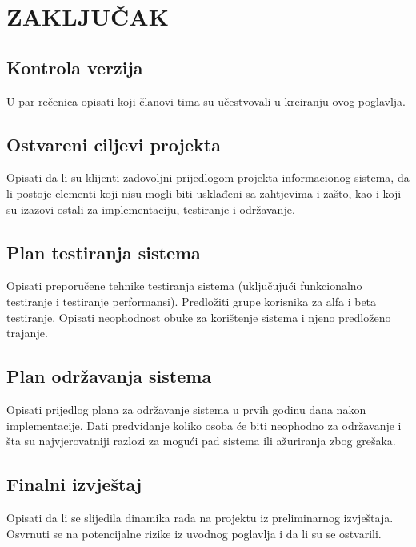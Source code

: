 \sloppy
\chapter{ZAKLJUČAK}

\sloppy
\section*{Kontrola verzija}

U par rečenica opisati koji članovi tima su učestvovali u kreiranju ovog poglavlja.

\sloppy
\section{Ostvareni ciljevi projekta}

Opisati da li su klijenti zadovoljni prijedlogom projekta informacionog sistema, da li postoje elementi koji nisu mogli biti usklađeni sa zahtjevima i zašto, kao i koji su izazovi ostali za implementaciju, testiranje i održavanje.

\sloppy
\section{Plan testiranja sistema}

Opisati preporučene tehnike testiranja sistema (uključujući funkcionalno testiranje i testiranje performansi). Predložiti grupe korisnika za alfa i beta testiranje. Opisati neophodnost obuke za korištenje sistema i njeno predloženo trajanje.

\sloppy
\section{Plan održavanja sistema}

Opisati prijedlog plana za održavanje sistema u prvih godinu dana nakon implementacije. Dati predviđanje koliko osoba će biti neophodno za održavanje i šta su najvjerovatniji razlozi za mogući pad sistema ili ažuriranja zbog grešaka.

\sloppy
\section{Finalni izvještaj}

Opisati da li se slijedila dinamika rada na projektu iz preliminarnog izvještaja. Osvrnuti se na potencijalne rizike iz uvodnog poglavlja i da li su se ostvarili.